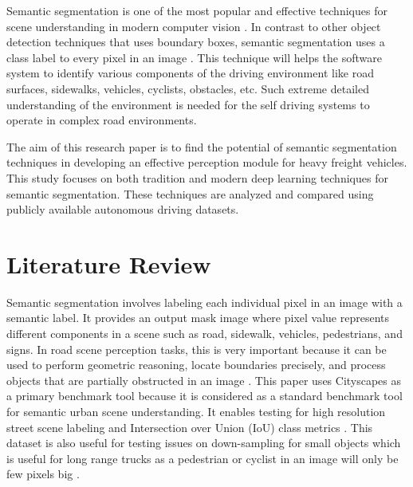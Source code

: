 \documentclass[10pt,journal,compsoc]{IEEEtran}
\begin{document}
Semantic segmentation is one of the most popular and effective techniques for scene understanding in modern computer vision \cite{Long_2015_CVPR, garciagarcia2017reviewdeeplearningtechniques}. In contrast to other object detection techniques that uses boundary boxes, semantic segmentation uses a class label to every pixel in an image \cite{he2018maskrcnn}. This technique will helps the software system to identify various components of the driving environment like road surfaces, sidewalks, vehicles, cyclists, obstacles, etc. Such extreme detailed understanding of the environment is needed for the self driving systems to operate in complex road environments.

The aim of this research paper is to find the potential of semantic segmentation techniques in developing an effective perception module for heavy freight vehicles. This study focuses on both tradition and modern deep learning techniques for semantic segmentation. These techniques are analyzed and compared using publicly available autonomous driving datasets.

\section{Literature Review}
Semantic segmentation involves labeling each individual pixel in an image with a semantic label. It provides an output mask image where  pixel value represents different components in a scene such as road, sidewalk, vehicles, pedestrians, and signs. In road scene perception tasks, this is very important because it can be used to perform geometric reasoning, locate boundaries precisely, and process objects that are partially obstructed in an image \cite{Cordts_2016_CVPR}. This paper uses Cityscapes as a primary benchmark tool because it is considered as a standard benchmark tool for semantic urban scene understanding. It enables testing for high resolution street scene labeling and Intersection over Union (IoU) class metrics \cite{Cordts_2016_CVPR}. This dataset is also useful for testing issues on down-sampling for small objects which is useful for long range trucks as a pedestrian or cyclist in an image will only be few pixels big \cite{Cordts_2016_CVPR}.
\end{document}

